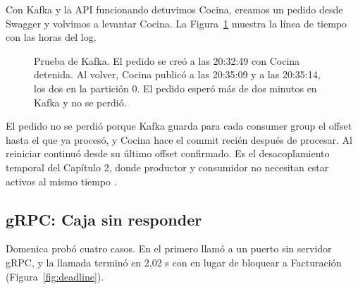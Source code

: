 Con Kafka y la API funcionando detuvimos Cocina, creamos un pedido desde Swagger y volvimos a levantar Cocina. La Figura~\ref{fig:kafka} muestra la línea de tiempo con las horas del log.

\begin{figure}[H]
\centering
{}
\caption{Prueba de Kafka. El pedido  se creó a las 20:32:49 con Cocina detenida. Al volver, Cocina publicó  a las 20:35:09 y  a las 20:35:14, los dos en la partición 0. El pedido esperó más de dos minutos en Kafka y no se perdió.}
\label{fig:kafka}
\end{figure}

El pedido no se perdió porque Kafka guarda para cada consumer group el offset hasta el que ya procesó, y Cocina hace el commit recién después de procesar. Al reiniciar continuó desde su último offset confirmado. Es el desacoplamiento temporal del Capítulo 2, donde productor y consumidor no necesitan estar activos al mismo tiempo \parencite{timbi2026comunicacion}.

\subsection{gRPC: Caja sin responder}

Domenica probó cuatro casos. En el primero llamó a un puerto sin servidor gRPC, y la llamada terminó en 2,02 s con  en lugar de bloquear a Facturación (Figura~\ref{fig:deadline}).

